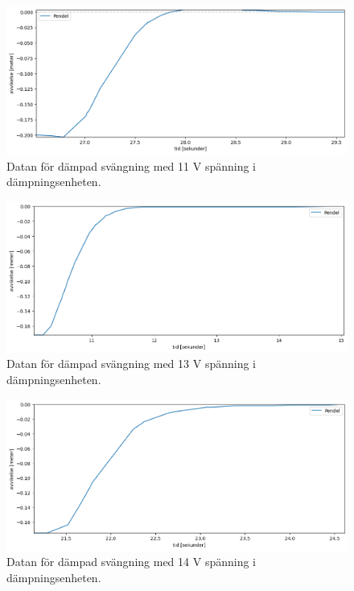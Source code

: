 \documentclass[12pt, a4paper]{article}
\begin{document}
\begin{figure}[hp]
    \includegraphics[width=\textwidth]{graf_11_v_centered.png}
    \caption{Datan för dämpad svängning med 11 V spänning i dämpningsenheten.}
    \label{fig:data_11_v}
\end{figure}

\begin{figure}[hp]
    \includegraphics[width=\textwidth]{graf_13_v_centered.png}
    \caption{Datan för dämpad svängning med 13 V spänning i dämpningsenheten.}
    \label{fig:data_13_v}
\end{figure}

\begin{figure}[hp]
    \includegraphics[width=\textwidth]{graf_14_v_centered.png}
    \caption{Datan för dämpad svängning med 14 V spänning i dämpningsenheten.}
    \label{fig:data_14_v}
\end{figure}
\end{document}
